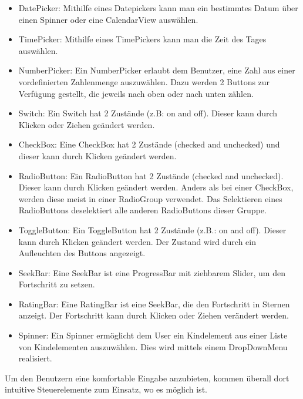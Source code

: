 \documentclass[FIPLY_base.tex]{subfiles}
\begin{document}
\begin{itemize}
	\item DatePicker: Mithilfe eines Datepickers kann man ein bestimmtes Datum über einen Spinner oder eine CalendarView auswählen.
	\item TimePicker: Mithilfe eines TimePickers kann man die Zeit des Tages auswählen.
	\item NumberPicker: Ein NumberPicker erlaubt dem Benutzer, eine Zahl aus einer vordefinierten Zahlenmenge auszuwählen. Dazu werden 2 Buttons zur Verfügung gestellt, die jeweils nach oben oder nach unten zählen.
	\item Switch: Ein Switch hat 2 Zustände (z.B: on and off). Dieser kann durch Klicken oder Ziehen geändert werden.
	\item CheckBox: Eine CheckBox hat 2 Zustände (checked and unchecked) und dieser kann durch Klicken geändert werden.
	\item RadioButton: Ein RadioButton hat 2 Zustände (checked and unchecked).
	Dieser kann durch Klicken geändert werden. Anders als bei einer CheckBox, werden diese meist in einer RadioGroup verwendet.
	Das Selektieren eines RadioButtons deselektiert alle anderen RadioButtons dieser Gruppe.
	\item ToggleButton: Ein ToggleButton hat 2 Zustände (z.B.: on and off). 
	Dieser kann durch Klicken geändert werden. Der Zustand wird durch ein Aufleuchten des Buttons angezeigt.
	\item SeekBar: Eine SeekBar ist eine ProgressBar mit ziehbarem Slider, um den Fortschritt zu setzen.
	\item RatingBar: Eine RatingBar ist eine SeekBar, die den Fortschritt in Sternen anzeigt. Der Fortschritt kann durch Klicken oder Ziehen verändert 
	werden.
	\item Spinner: Ein Spinner ermöglicht dem User ein Kindelement aus einer Liste von Kindelementen auszuwählen. Dies wird mittels einem 
	DropDownMenu realisiert.	
\end{itemize}
Um den Benutzern eine komfortable Eingabe anzubieten, kommen überall dort intuitive Steuerelemente zum Einsatz, wo es möglich ist.
\end{document}
